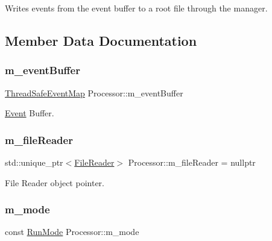 Writes events from the event buffer to a root file through the manager. 



\subsection{Member Data Documentation}
\mbox{\label{class_processor_a7cb15fbab19fceb6bc5a607629ff5040}} 
\subsubsection{\texorpdfstring{m\+\_\+event\+Buffer}{m\_eventBuffer}}
{\footnotesize\ttfamily \hyperlink{class_thread_safe_event_map}{Thread\+Safe\+Event\+Map} Processor\+::m\+\_\+event\+Buffer\hspace{0.3cm}{\ttfamily [private]}}



\hyperlink{class_event}{Event} Buffer. 

\mbox{\label{class_processor_aafe2ae55e609005c0e88226f1dd1dcb5}} 
\subsubsection{\texorpdfstring{m\+\_\+file\+Reader}{m\_fileReader}}
{\footnotesize\ttfamily std\+::unique\+\_\+ptr$<$\hyperlink{class_file_reader}{File\+Reader}$>$ Processor\+::m\+\_\+file\+Reader = nullptr\hspace{0.3cm}{\ttfamily [private]}}



File Reader object pointer. 

\mbox{\label{class_processor_ac22f412163181f546d847ce23d71978d}} 
\subsubsection{\texorpdfstring{m\+\_\+mode}{m\_mode}}
{\footnotesize\ttfamily const \hyperlink{_modes_enum_8hpp_a3dfe11cf1a3a8121f6cd7fec4bf5947e}{Run\+Mode} Processor\+::m\+\_\+mode\hspace{0.3cm}{\ttfamily [private]}}



